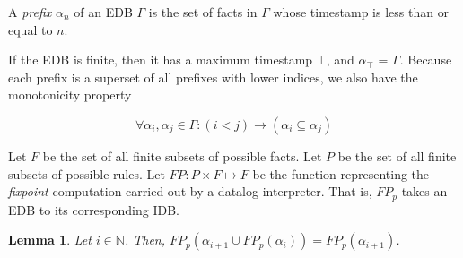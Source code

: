 \begin{definition}
A \emph{prefix} $\alpha_{n}$ of an EDB $\Gamma$ is the set of facts in $\Gamma$ whose timestamp is less than or equal to $n$.
\end{definition}

If the EDB is finite, then it has a maximum timestamp $\top$, and $\alpha_{\top}$ = $\Gamma$.  Because each prefix is a superset of all 
prefixes with lower indices, we also have the monotonicity property

\begin{equation}
\forall \alpha_{i}, \alpha_{j} \in \Gamma : (i < j) \to (\alpha_{i} \subseteq \alpha_{j})
\end{equation}



\begin{definition}
Let $F$ be the set of all finite subsets of possible facts.   
Let $P$ be the set of all finite subsets of possible rules.
Let $FP : P \times F \mapsto F$ be the function representing the
\emph{fixpoint} computation carried out by a datalog interpreter.  That is, $FP_p$ takes an EDB to its corresponding IDB.
\end{definition}

\newtheorem{lemma}{Lemma} 

\begin{lemma}
%
Let $i \in \mathbb{N}$.  Then, $FP_p(\alpha_{i+1} \cup FP_p(\alpha_i)) =
FP_p(\alpha_{i+1})$.
%
\end{lemma}


